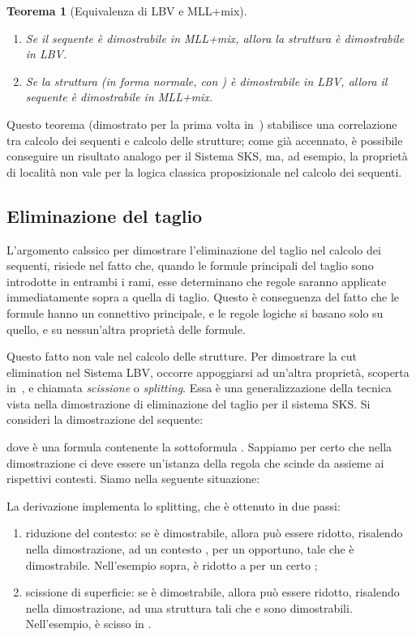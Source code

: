 \documentclass[12pt,a4paper,openright,twoside]{report}
\newtheorem{thm}{Teorema}[section]
\begin{document}
\begin{thm}[Equivalenza di \textsf{LBV} e \textsf{MLL+mix}]~\\
\begin{enumerate}[label=\roman*)]
	\item Se il sequente  \`e dimostrabile in \textsf{MLL+mix}, allora la struttura  \`e dimostrabile in \textsf{LBV}.
	\item Se la struttura  (in forma normale, con ) \`e dimostrabile in \textsf{LBV}, allora il sequente  \`e dimostrabile in \textsf{MLL+mix}.
\end{enumerate}
\end{thm}

Questo teorema (dimostrato per la prima volta in~\cite{Gug02}) stabilisce una correlazione tra calcolo dei sequenti e calcolo delle strutture; come gi\`a accennato, \`e possibile conseguire un risultato analogo per il Sistema \textsf{SKS}, ma, ad esempio, la propriet\`a di localit\`a non vale per la logica classica proposizionale nel calcolo dei sequenti.

\newpage

\subsection{Eliminazione del taglio} 
L'argomento calssico per dimostrare l'eliminazione del taglio nel calcolo dei sequenti, risiede nel fatto che, quando le formule principali del taglio sono introdotte in entrambi i rami, esse determinano che regole saranno applicate immediatamente sopra a quella di taglio. Questo \`e conseguenza del fatto che le formule hanno un connettivo principale, e le regole logiche si basano solo su quello, e su nessun'altra propriet\`a delle formule.

Questo fatto non vale nel calcolo delle strutture. Per dimostrare la cut elimination nel Sistema \textsf{LBV}, occorre appoggiarsi ad un'altra propriet\`a, scoperta in~\cite{Gug02}, e chiamata \emph{scissione} o \emph{splitting}. Essa \`e una generalizzazione della tecnica vista nella dimostrazione di eliminazione del taglio per il sistema \textsf{SKS}. Si consideri la dimostrazione del sequente:

dove  \`e una formula contenente la sottoformula . Sappiamo per certo che nella dimostrazione ci deve essere un'istanza della regola  che scinde  da  assieme ai rispettivi contesti. Siamo nella seguente situazione:

La derivazione  implementa lo splitting, che \`e ottenuto in due passi:
\begin{enumerate}
	\item riduzione del contesto: se  \`e dimostrabile, allora  pu\`o essere ridotto, risalendo nella dimostrazione, ad un contesto , per un  opportuno, tale che  \`e dimostrabile. Nell'esempio sopra,  \`e ridotto a  per un certo ;
	\item scissione di superficie: se  \`e dimostrabile, allora  pu\`o essere ridotto, risalendo nella dimostrazione, ad una struttura  tali che  e  sono dimostrabili. Nell'esempio,  \`e scisso in .
\end{enumerate}
\end{document}
